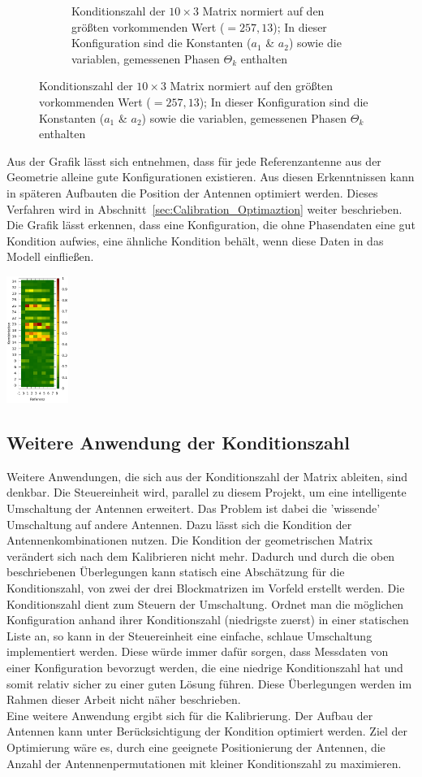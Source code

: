 \begin{figure}[h!]
\begin{subfigure}[t]{0.45\textwidth}
                 \caption{Konditionszahl der $10\times3$ Matrix normiert auf den größten vorkommenden Wert ($=257,13$); In dieser Konfiguration sind die Konstanten ($a_1$ \& $a_2$) sowie die variablen, gemessenen Phasen $\Theta_k$ enthalten}
                 \label{fig:AnalyzeOf10x3}
         \end{subfigure}
%
\end{figure}
%
Aus der Grafik lässt sich entnehmen, dass für jede Referenzantenne aus der Geometrie alleine gute Konfigurationen existieren. Aus diesen Erkenntnissen kann in späteren Aufbauten die Position der Antennen optimiert werden. Dieses Verfahren wird in Abschnitt~\ref{sec:Calibration_Optimaztion} weiter beschrieben. Die Grafik lässt erkennen, dass eine Konfiguration, die ohne Phasendaten eine gut Kondition aufwies, eine ähnliche Kondition behält, wenn diese Daten in das Modell einfließen.
\\

\begin{floatingfigure}[r!]{5cm}
 \centering
         \includegraphics[width=2cm]{img/ConditionPlot_scaled.png}
         \caption[Profil einer Phasenmessung222]{Normiertes Höhenprofil einer Phasenmessung aus der Sicht von Antenne 1 }
%         
\end{floatingfigure}
%
\subsection{Weitere Anwendung der Konditionszahl}
Weitere Anwendungen, die sich aus der Konditionszahl der Matrix ableiten, sind denkbar. Die Steuereinheit wird, parallel zu diesem Projekt, um eine intelligente Umschaltung der Antennen erweitert. Das Problem ist dabei die 'wissende' Umschaltung auf andere Antennen. Dazu lässt sich die Kondition der Antennenkombinationen nutzen. Die Kondition der geometrischen Matrix verändert sich nach dem Kalibrieren nicht mehr. Dadurch und durch die oben beschriebenen Überlegungen kann statisch eine Abschätzung für die Konditionszahl, von zwei der drei Blockmatrizen im Vorfeld erstellt werden. Die Konditionszahl dient zum Steuern der Umschaltung. Ordnet man die möglichen Konfiguration anhand ihrer Konditionszahl (niedrigste zuerst) in einer statischen Liste an, so kann in der Steuereinheit eine einfache, schlaue Umschaltung implementiert werden. Diese würde immer dafür sorgen, dass Messdaten von einer Konfiguration bevorzugt werden, die eine niedrige Konditionszahl hat und somit relativ sicher zu einer guten Lösung führen. Diese Überlegungen werden im Rahmen dieser Arbeit nicht näher beschrieben.\\

Eine weitere Anwendung ergibt sich für die Kalibrierung. Der Aufbau der Antennen kann unter Berücksichtigung der Kondition optimiert werden. Ziel der Optimierung wäre es, durch eine geeignete Positionierung der Antennen, die Anzahl der Antennenpermutationen mit kleiner Konditionszahl zu maximieren.